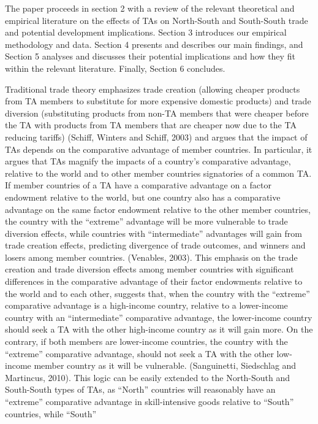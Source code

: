 The paper proceeds in section 2 with a review of the relevant
theoretical and empirical literature on the effects of TAs on
North-South and South-South trade and potential development
implications. Section 3 introduces our empirical methodology and data.
Section 4 presents and describes our main findings, and Section 5
analyses and discusses their potential implications and how they fit
within the relevant literature. Finally, Section 6 concludes.

Traditional trade theory emphasizes trade creation (allowing cheaper
products from TA members to substitute for more expensive domestic
products) and trade diversion (substituting products from non-TA members
that were cheaper before the TA with products from TA members that are
cheaper now due to the TA reducing tariffs) (Schiff, Winters and Schiff,
2003) and argues that the impact of TAs depends on the comparative
advantage of member countries. In particular, it argues that TAs magnify
the impacts of a country's comparative advantage, relative to the world
and to other member countries signatories of a common TA. If member
countries of a TA have a comparative advantage on a factor endowment
relative to the world, but one country also has a comparative advantage
on the same factor endowment relative to the other member countries, the
country with the ``extreme'' advantage will be more vulnerable to trade
diversion effects, while countries with ``intermediate'' advantages will
gain from trade creation effects, predicting divergence of trade
outcomes, and winners and losers among member countries. (Venables,
2003). This emphasis on the trade creation and trade diversion effects
among member countries with significant differences in the comparative
advantage of their factor endowments relative to the world and to each
other, suggests that, when the country with the ``extreme'' comparative
advantage is a high-income country, relative to a lower-income country
with an ``intermediate'' comparative advantage, the lower-income country
should seek a TA with the other high-income country as it will gain
more. On the contrary, if both members are lower-income countries, the
country with the ``extreme'' comparative advantage, should not seek a TA
with the other low-income member country as it will be vulnerable.
(Sanguinetti, Siedschlag and Martincus, 2010). This logic can be easily
extended to the North-South and South-South types of TAs, as ``North''
countries will reasonably have an ``extreme'' comparative advantage in
skill-intensive goods relative to ``South'' countries, while ``South''
